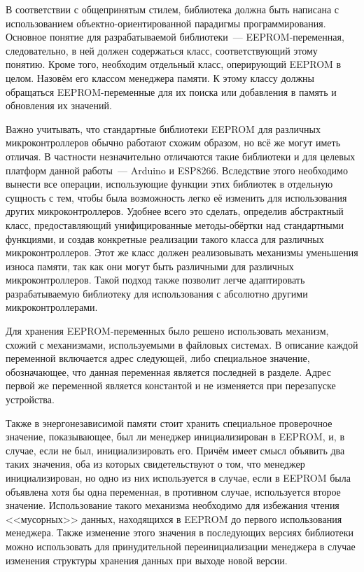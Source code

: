 В соответствии с общепринятым стилем, библиотека должна быть написана с использованием объектно-ориентированной парадигмы программирования.
Основное понятие для разрабатываемой библиотеки~--- EEPROM-переменная, следовательно, в ней должен содержаться класс, соответствующий этому понятию.
Кроме того, необходим отдельный класс, оперирующий EEPROM в целом. Назовём его классом менеджера памяти.
К этому классу должны обращаться EEPROM-переменные для их поиска или добавления в память и обновления их значений.

Важно учитывать, что стандартные библиотеки EEPROM для различных микроконтроллеров обычно работают схожим образом, но всё же могут иметь отличая.
В частности незначительно отличаются такие библиотеки и для целевых платформ данной работы~--- Arduino и ESP8266.
Вследствие этого необходимо вынести все операции, использующие функции этих библиотек в отдельную сущность с тем, чтобы была возможность легко её изменить для использования других микроконтроллеров.
Удобнее всего это сделать, определив абстрактный класс, предоставляющий унифицированные методы-обёртки над стандартными функциями, и создав конкретные реализации такого класса для различных микроконтроллеров.
Этот же класс должен реализовывать механизмы уменьшения износа памяти, так как они могут быть различными для различных микроконтроллеров.
Такой подход также позволит легче адаптировать разрабатываемую библиотеку для использования с абсолютно другими микроконтроллерами.

Для хранения EEPROM-переменных было решено использовать механизм, схожий с механизмами, используемыми в файловых системах.
В описание каждой переменной включается адрес следующей, либо специальное значение, обозначающее, что данная переменная является последней в разделе.
Адрес первой же переменной является константой и не изменяется при перезапуске устройства.

Также в энергонезависимой памяти стоит хранить специальное проверочное значение, показывающее, был ли менеджер инициализирован в EEPROM, и, в случае, если не был, инициализировать его.
Причём имеет смысл объявить два таких значения, оба из которых свидетельствуют о том, что менеджер инициализирован, но одно из них используется в случае, если в EEPROM была объявлена хотя бы одна переменная, в противном случае, используется второе значение.
Использование такого механизма необходимо для избежания чтения <<мусорных>> данных, находящихся в EEPROM до первого использования менеджера.
Также изменение этого значения в последующих версиях библиотеки можно использовать для принудительной переинициализации менеджера в случае изменения структуры хранения данных при выходе новой версии.

